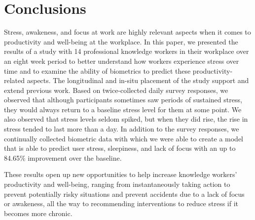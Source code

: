 \section{Conclusions} 
Stress, awakeness, and focus at work are highly relevant aspects when
it comes to productivity and well-being at the workplace. In this
paper, we presented the results of a study with 14 professional
knowledge workers in their workplace over an eight week period to
better understand how workers experience stress over time and to
examine the ability of biometrics to predict these
productivity-related aspects. The longitudinal and in-situ placement of
the study support and extend previous work. Based on
twice-collected daily survey responses, we observed that
although participants sometimes saw periods of sustained stress,
they would always return to a baseline stress level for them
at some point. We also observed that stress levels seldom spiked,
but when they did rise, the rise in stress tended to last more
than a day. In addition to the survey responses, we 
continually collected
biometric data with which we were able to create a model that is able to
predict user stress, sleepiness, and lack of focus with an up to 84.65\% improvement over the baseline.

These results open up new opportunities to help increase knowledge
workers' productivity and well-being, ranging from instantaneously
taking action to prevent potentially risky situations and prevent
accidents due to a lack of focus or awakeness, all the way to
recommending interventions to reduce stress if it becomes more
chronic.




